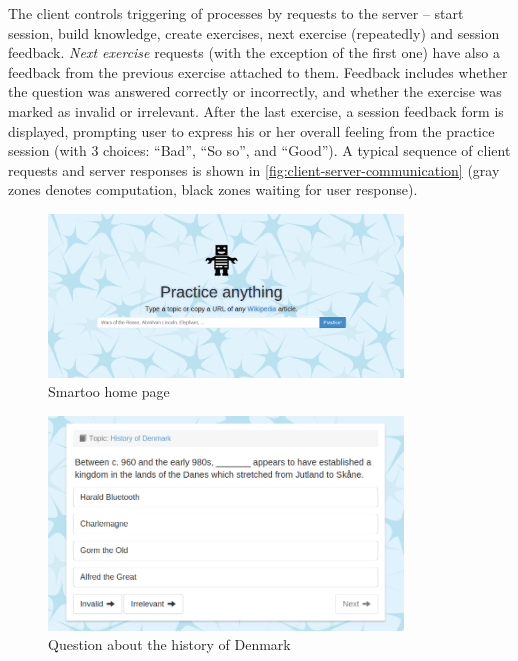\documentclass[12pt, twoside]{fithesis2}		%
\renewcommand{\_}{\leavevmode \kern0.07em\vbox{\hrule width0.4em}}
\newcounter{choice}
\begin{document}
The client controls triggering of processes by requests to the server -- start session, build knowledge, create exercises, next exercise (repeatedly) and session feedback.
\emph{Next exercise} requests (with the exception of the first one) have also a feedback from the previous exercise attached to them.
Feedback includes whether the question was answered correctly or incorrectly, and whether the exercise was marked as invalid or irrelevant.
After the last exercise, a session feedback form is displayed, prompting user to express his or her overall feeling from the practice session (with 3 choices: ``Bad'', ``So so'', and ``Good'').
A typical sequence of client requests and server responses is shown in
\autoref{fig:client-server-communication} (gray zones denotes computation, black zones waiting for user response).

\begin{figure}[h]
  \centering
  \includegraphics[width=0.84\textwidth]{images/home-page.png}
  \caption{Smartoo home page}
  \label{fig:smartoo-home}
\end{figure}

\begin{figure}[h]
  \centering
  \includegraphics[width=0.84\textwidth]{images/question-unanswered.png}
  \caption{Question about the history of Denmark}
  \label{fig:question-unanswered}
\end{figure}
\end{document}
